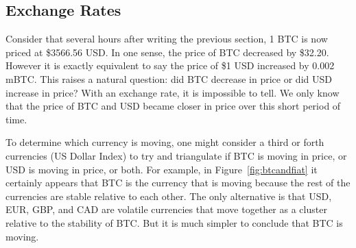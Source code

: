 \subsection{Exchange Rates}

Consider that several hours after writing the previous section, 1 BTC is now priced at \$3566.56 USD. In one sense, the price of BTC decreased by \$32.20. However it is exactly equivalent to say the price of \$1 USD increased by 0.002 mBTC. This raises a natural question: did BTC decrease in price or did USD increase in price? With an exchange rate, it is impossible to tell. We only know that the price of BTC and USD became closer in price over this short period of time.

To determine which currency is moving, one might consider a third or forth currencies (\cf US Dollar Index) to try and triangulate if BTC is moving in price, or USD is moving in price, or both. For example, in Figure~\ref{fig:btcandfiat} it certainly appears that BTC is the currency that is moving because the rest of the currencies are stable relative to each other. The only alternative is that USD, EUR, GBP, and CAD are volatile currencies that move together as a cluster relative to the stability of BTC. But it is much simpler to conclude that BTC is moving.

